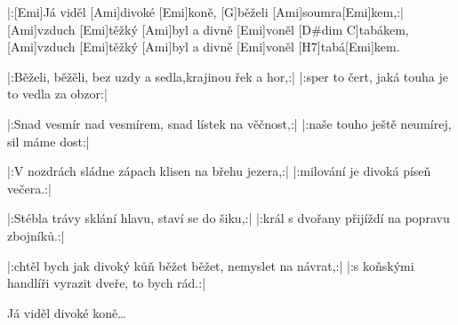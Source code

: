 
\sloka
|:[Emi]Já viděl [Ami]divoké [Emi]koně, [G]běželi [Ami]soumra[Emi]kem,:|
[Ami]vzduch [Emi]těžký [Ami]byl a divně [Emi]voněl [D#dim C]tabákem,
[Ami]vzduch [Emi]těžký [Ami]byl a divně [Emi]voněl [H7]tabá[Emi]kem.

\sloka
|:Běželi, běžěli, bez uzdy a sedla,krajinou řek a hor,:|
|:sper to čert, jaká touha je to vedla za obzor:|

\sloka
|:Snad vesmír nad vesmírem, snad lístek na věčnost,:|
|:naše touho ještě neumírej, sil máme dost:|

\sloka
|:V nozdrách sládne zápach klisen na břehu jezera,:|
|:milování je divoká píseň večera.:|

\sloka
|:Stébla trávy sklání hlavu, staví se do šiku,:|
|:král s dvořany přijíždí na popravu zbojníků.:|

\sloka
|:chtěl bych jak divoký kůň běžet běžet, nemyslet na návrat,:|
|:s koňskými handlíři vyrazit dveře, to bych rád.:|

\napis{}
Já viděl divoké koně… 
